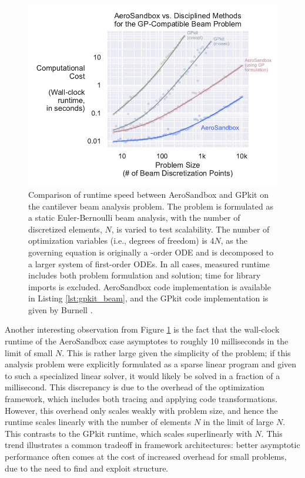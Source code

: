 \begin{figure}[H]
    \centering
    \includegraphics[width=\textwidth]{../figures/benchmark_gp_beam.pdf}
    \caption{Comparison of runtime speed between AeroSandbox and GPkit on the cantilever beam analysis problem. The problem is formulated as a static Euler-Bernoulli beam analysis, with the number of discretized elements, $N$, is varied to test scalability. The number of optimization variables (i.e., degrees of freedom) is $4N$, as the governing equation is originally a -order ODE and is decomposed to a larger system of first-order ODEs. In all cases, measured runtime includes both problem formulation and solution; time for library imports is excluded. AeroSandbox code implementation is available in Listing \ref{lst:gpkit_beam}, and the GPkit code implementation is given by Burnell \cite{gpkit_beam}.}
    \label{fig:benchmark_gp_beam}
\end{figure}

Another interesting observation from Figure \ref{fig:benchmark_gp_beam} is the fact that the wall-clock runtime of the AeroSandbox case asymptotes to roughly 10 milliseconds in the limit of small $N$. This is rather large given the simplicity of the problem; if this analysis problem were explicitly formulated as a sparse linear program and given to such a specialized linear solver, it would likely be solved in a fraction of a millisecond. This discrepancy is due to the overhead of the optimization framework, which includes both tracing and applying code transformations. However, this overhead only scales weakly with problem size, and hence the runtime scales linearly with the number of elements $N$ in the limit of large $N$. This contrasts to the GPkit runtime, which scales superlinearly with $N$. This trend illustrates a common tradeoff in framework architectures: better asymptotic performance often comes at the cost of increased overhead for small problems, due to the need to find and exploit structure.

